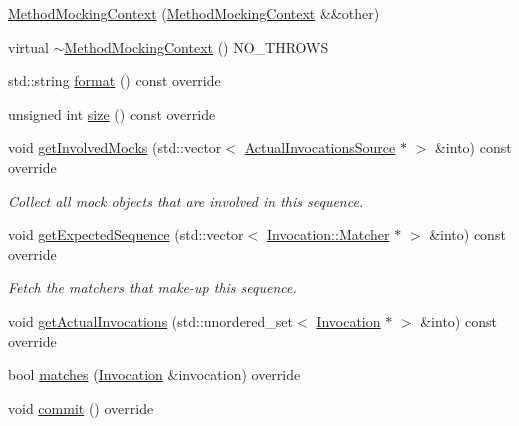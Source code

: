 \begin{DoxyCompactItemize}
\item 
\mbox{\hyperlink{classfakeit_1_1MethodMockingContext_af4dcf1f0a24f7cedd1d4c5ee23d1a313}{Method\+Mocking\+Context}} (\mbox{\hyperlink{classfakeit_1_1MethodMockingContext}{Method\+Mocking\+Context}} \&\&other)
\item 
virtual \mbox{\hyperlink{classfakeit_1_1MethodMockingContext_a92068a8b1affe1c7be6eafc12297c8c2}{$\sim$\+Method\+Mocking\+Context}} () N\+O\+\_\+\+T\+H\+R\+O\+WS
\item 
std\+::string \mbox{\hyperlink{classfakeit_1_1MethodMockingContext_a0e71b77ab7f91d629a5853542d48624a}{format}} () const override
\item 
unsigned int \mbox{\hyperlink{classfakeit_1_1MethodMockingContext_a47e66f1a704bad7681f70a3e612d08a6}{size}} () const override
\item 
void \mbox{\hyperlink{classfakeit_1_1MethodMockingContext_ac66ba7b51a3c845b8fe8f2fa0f5f5ff0}{get\+Involved\+Mocks}} (std\+::vector$<$ \mbox{\hyperlink{structfakeit_1_1ActualInvocationsSource}{Actual\+Invocations\+Source}} $\ast$ $>$ \&into) const override
\begin{DoxyCompactList}\small\item\em Collect all mock objects that are involved in this sequence. \end{DoxyCompactList}\item 
void \mbox{\hyperlink{classfakeit_1_1MethodMockingContext_ab88d912b17801968fab8443079e2eabc}{get\+Expected\+Sequence}} (std\+::vector$<$ \mbox{\hyperlink{structfakeit_1_1Invocation_1_1Matcher}{Invocation\+::\+Matcher}} $\ast$ $>$ \&into) const override
\begin{DoxyCompactList}\small\item\em Fetch the matchers that make-\/up this sequence. \end{DoxyCompactList}\item 
void \mbox{\hyperlink{classfakeit_1_1MethodMockingContext_ad6803405abfd419799882f837d6f56b6}{get\+Actual\+Invocations}} (std\+::unordered\+\_\+set$<$ \mbox{\hyperlink{structfakeit_1_1Invocation}{Invocation}} $\ast$ $>$ \&into) const override
\item 
bool \mbox{\hyperlink{classfakeit_1_1MethodMockingContext_a240fe9e15cffcebd52f5b0c9ccf87654}{matches}} (\mbox{\hyperlink{structfakeit_1_1Invocation}{Invocation}} \&invocation) override
\item 
void \mbox{\hyperlink{classfakeit_1_1MethodMockingContext_a68a56b3fbd0a2b654a1c72de66e68a71}{commit}} () override
\item 

\end{DoxyCompactItemize}

